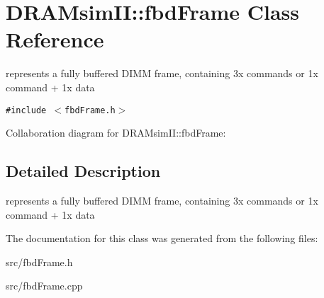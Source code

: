 \section{DRAMsimII::fbdFrame Class Reference}
\label{class_d_r_a_msim_i_i_1_1fbd_frame}
represents a fully buffered DIMM frame, containing 3x commands or 1x command + 1x data  


{\tt \#include $<$fbdFrame.h$>$}

Collaboration diagram for DRAMsimII::fbdFrame:

\subsection{Detailed Description}
represents a fully buffered DIMM frame, containing 3x commands or 1x command + 1x data 

The documentation for this class was generated from the following files:\begin{CompactItemize}
\item 
src/fbdFrame.h\item 
src/fbdFrame.cpp\end{CompactItemize}
